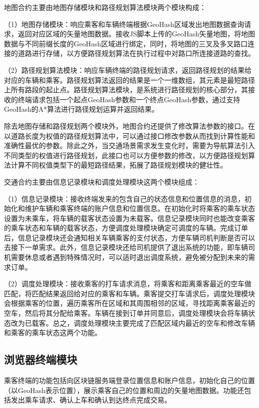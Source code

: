 地图合约主要由地图存储模块和路径规划算法模块两个模块构成：

（1）地图存储模块：响应乘客和车辆终端根据GeoHash区域发出地图数据查询请求，返回对应区域的矢量地图数据。接收JS脚本上传的GeoHash矢量地图，将地图数据与不同前缀长度的GeoHash区域进行绑定，同时，将地图的三叉及多叉路口连接的道路进行存储，以方便路径规划算法在执行过程中对路口所连接道路的查找。

（2）路径规划算法模块：响应车辆终端的路径规划请求，返回路径规划的结果给对应的车辆和乘客。路径规划算法返回的结果是一个一维数组，其元素是最短路径上所有路段的起止点。路径规划算法模块，是系统进行路径规划的核心部分，其接收的终端请求包括一个起点GeoHash参数和一个终点GeoHash参数，通过支持GeoHash的A*算法进行路径规划运算并返回结果。

除去地图存储和路径规划两个模块外，地图合约还提供了修改算法参数的接口。在以道路长度为权值的路径规划算法中，可以通过接口修改参数从而找到计算性能和准确性最优的参数。除此之外，当交通场景需求发生变化时，需要为导航算法引入不同类型的权值进行路径规划，此接口也可以方便参数的修改，以方便路径规划算法计算不同权值类型下的最短路径结果，拓展了路径规划模块的健壮性。

交通合约主要由信息记录模块和调度处理模块这两个模块组成：

（1）信息记录模块：接收终端发来的包含自己的状态信息和位置信息的消息，初始化和维护车辆和乘客终端的账户信息和位置信息。在初始化时将乘客的乘车状态设置为未乘车，将车辆的载客状态设置为未载客。信息记录模块同时也能改变乘客的乘车状态和车辆的载客状态，方便调度处理模块确定可调度的车辆。完成订单后，信息记录模块还会通知相关车辆乘客的支付状态，方便车辆司机判断是否可以去接下一单需求。此外，信息记录模块还给司机提供了退出系统的功能，即车辆司机需要休息或者遇到特殊情况时，可以适时退出调度系统，避免被分配到未来的需求订单。

（2）调度处理模块：接收乘客的打车请求消息，将乘客和距离乘客最近的空车做匹配，将匹配结果返回给对应的乘客和车辆。乘客提交打车请求后，调度处理模块会根据乘客的位置，遍历乘客所在区域和其周围相邻的区域，寻找距离乘客最近的空车，然后将其分配给乘客。车辆在接到订单并同意后，调度处理模块会将车辆状态改为已载客。总之，调度处理模块主要完成了匹配区域内最近的空车和修改车辆和乘客的乘车状态这两个功能。


\subsection{浏览器终端模块}
乘客终端的功能包括向区块链服务端登录位置信息和账户信息，初始化自己的位置（以GeoHash表示位置），展示乘客自己的位置和周边的矢量地图数据。功能还包括发出乘车请求、确认上车和确认到达终点完成交易。


